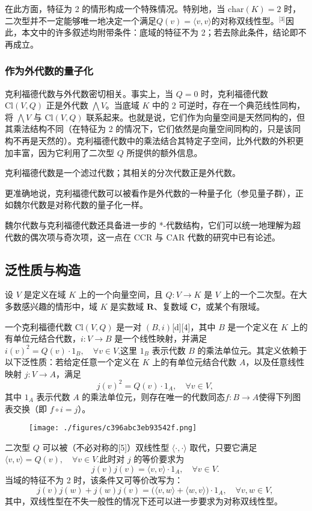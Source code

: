 在此方面，特征为 2 的情形构成一个特殊情况。特别地，当 $\mathrm{char}(K) = 2$ 时，二次型并不一定能够唯一地决定一个满足$Q(v) = \langle v, v \rangle$的对称双线性型。\(^\text{[3]}\)因此，本文中的许多叙述均附带条件：底域的特征不为 2；若去除此条件，结论即不再成立。
\subsubsection{作为外代数的量子化}
克利福德代数与外代数密切相关。事实上，当 $Q = 0$ 时，克利福德代数 $\mathrm{Cl}(V, Q)$ 正是外代数 $\bigwedge V$。当底域 $K$ 中的 $2$ 可逆时，存在一个典范线性同构，将 $\bigwedge V$ 与 $\mathrm{Cl}(V, Q)$ 联系起来。也就是说，它们作为向量空间是天然同构的，但其乘法结构不同（在特征为 2 的情况下，它们依然是向量空间同构的，只是该同构不再是天然的）。克利福德代数中的乘法结合其特定子空间，比外代数的外积更加丰富，因为它利用了二次型 $Q$ 所提供的额外信息。

克利福德代数是一个滤过代数；其相关的分次代数正是外代数。

更准确地说，克利福德代数可以被看作是外代数的一种量子化（参见量子群），正如魏尔代数是对称代数的量子化一样。

魏尔代数与克利福德代数还具备进一步的 *-代数结构，它们可以统一地理解为超代数的偶次项与奇次项，这一点在 CCR 与 CAR 代数的研究中已有论述。
\subsection{泛性质与构造}
设 $V$ 是定义在域 $K$ 上的一个向量空间，且 $Q : V \to K$ 是 $V$ 上的一个二次型。在大多数感兴趣的情形中，域 $K$ 是实数域 $\mathbf{R}$、复数域 $\mathbf{C}$，或某个有限域。

一个克利福德代数 $\mathrm{Cl}(V, Q)$ 是一对 $(B, i)$[d][4]，其中 $B$ 是一个定义在 $K$ 上的有单位元结合代数，$i : V \to B$ 是一个线性映射，并满足$i(v)^2 = Q(v) \cdot 1_B, \quad \forall v \in V$,这里 $1_B$ 表示代数 $B$ 的乘法单位元。其定义依赖于以下泛性质：若给定任意一个定义在 $K$ 上的有单位元结合代数 $A$，以及任意线性映射 $j : V \to A$，满足
$$
j(v)^2 = Q(v) \cdot 1_A, \quad \forall v \in V,~
$$
其中 $1_A$ 表示代数 $A$ 的乘法单位元，则存在唯一的代数同态$f : B \to A$使得下列图表交换（即 $f \circ i = j$）。
\begin{figure}[ht]
\centering
\texttt{[image: ./figures/c396abc3eb93542f.png]}
\caption{} \label{fig_KLFds_1}
\end{figure}
二次型 $Q$ 可以被（不必对称的[5]）双线性型 $\langle \cdot, \cdot \rangle$ 取代，只要它满足$\langle v, v \rangle = Q(v), \quad \forall v \in V$.此时对 $j$ 的等价要求为
$$
j(v) j(v) = \langle v, v \rangle \cdot 1_A, \quad \forall v \in V.~
$$
当域的特征不为 2 时，该条件又可等价改写为：
$$
j(v) j(w) + j(w) j(v) = \big(\langle v, w \rangle + \langle w, v \rangle\big)\cdot 1_A, \quad \forall v, w \in V,~
$$
其中，双线性型在不失一般性的情况下还可以进一步要求为对称双线性型。

